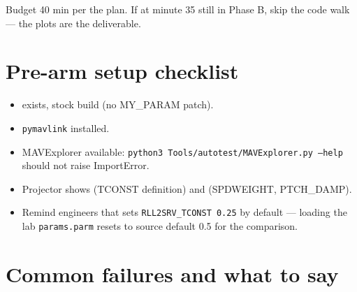 \documentclass[a4paper,11pt,twoside]{article}
\begin{document}
Budget 40 min per the plan. If at minute 35 still in Phase B, skip the code walk --- the plots are the deliverable.

\section*{Pre-arm setup checklist}

\begin{itemize}[label={[ ]}]
  \item {} exists, stock build (no MY\_PARAM patch).
  \item \texttt{pymavlink} installed.
  \item MAVExplorer available: \texttt{python3 Tools/autotest/MAVExplorer.py --help} should not raise ImportError.
  \item Projector shows  (TCONST definition) and  (SPDWEIGHT, PTCH\_DAMP).
  \item Remind engineers that  sets \texttt{RLL2SRV\_TCONST 0.25} by default --- loading the lab \texttt{params.parm} resets to source default 0.5 for the comparison.
\end{itemize}

\section*{Common failures and what to say}
\end{document}
